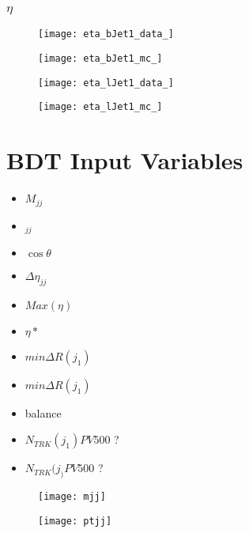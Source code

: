 			\subsubsection{$\eta$}

				\begin{figure}[h]
					\centering

					\begin{minipage}[h]{0.33\linewidth}
						\texttt{[image: eta\_bJet1\_data\_]}
					\end{minipage}
					\quad
					\begin{minipage}[h]{0.33\linewidth}
						\texttt{[image: eta\_bJet1\_mc\_]}
					\end{minipage}

					\begin{minipage}[h]{0.33\linewidth}
						\texttt{[image: eta\_lJet1\_data\_]}
					\end{minipage}
					\quad
					\begin{minipage}[h]{0.33\linewidth}
						\texttt{[image: eta\_lJet1\_mc\_]}
					\end{minipage}
					\label{fig:kin:eta2c4j}
				\end{figure}


\section{BDT Input Variables}

	\begin{itemize}
		\item $M_{jj}$
		\item \pt$_{jj}$
		\item $\cos \theta$
		\item $\Delta\eta_{jj}$
		\item $Max(\eta)$
		\item $\eta*$
		\item $min\Delta R(j_1)$
		\item $min\Delta R(j_1)$
		\item \pt balance
		\item $N_{TRK}(j_1) PV500$ ?
		\item $N_{TRK}(j_) PV500$ ?
	\end{itemize}

		\begin{figure}[h]
			\begin{minipage}[h]{0.45\linewidth}
				\texttt{[image: mjj]}
				\caption{}
				\label{fig:bdtmjj}
			\end{minipage}
			\quad
			\begin{minipage}[h]{0.45\linewidth}
				\texttt{[image: ptjj]}
				\caption{}
				\label{fig:bdtptjj}
			\end{minipage}
		\end{figure}

